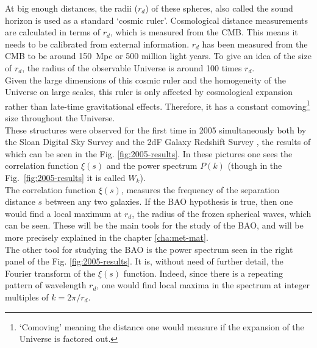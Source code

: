 At big enough distances, the radii ($r_d$) of these spheres, also called the sound horizon is used as a standard `cosmic ruler'. Cosmological distance measurements are calculated in terms of $r_d$, which is measured from the CMB. This means it needs to be calibrated from external information. $ r_d$ has been measured from the CMB to be around  \SI{150}{Mpc} or 500 million light years.
To give an idea of the size of $r_d$, the radius of the observable Universe is around 100 times $r_d$. \\

Given the large dimensions of this cosmic ruler and the homogeneity of the Universe on large scales, this ruler is only affected by cosmological expansion rather than late-time gravitational effects. Therefore, it has a constant comoving\footnote{`Comoving' meaning the distance one would measure if the expansion of the Universe is factored out.} size throughout the Universe.\\

These structures were observed for the first time in 2005 simultaneously both by the Sloan Digital Sky Survey \cite{Eisenstein2005} and the 2dF Galaxy Redshift Survey \cite{2dFCole2005}, the results of which can be seen in the Fig. \ref{fig:2005-results}. In these pictures one sees the correlation function  $\xi(s)$ and the power spectrum $P(k)$ (though in the Fig.~\ref{fig:2005-results} it is called $W_k$). \\
 
The correlation function $\xi(s)$, measures the frequency of the separation distance $s$ between any two galaxies. If the BAO hypothesis is true, then one would find a local maximum at $r_d$, the radius of the frozen spherical waves, which can be seen. These will be the main tools for the study of the BAO, and will be more precisely explained in the chapter \ref{cha:met-mat}.\\

The other tool for studying the BAO is the power spectrum seen in the right panel of the Fig. \ref{fig:2005-results}. It is, without need of further detail, the Fourier transform of the $\xi(s)$ function. Indeed, since there is a repeating pattern of wavelength $r_d$, one would find local maxima in the spectrum at integer multiples of $k = 2\pi /r_d$. \\



